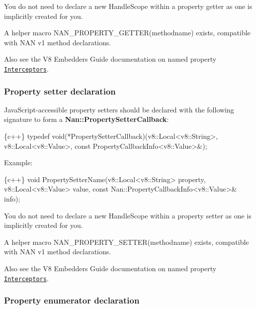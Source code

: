 You do not need to declare a new {\ttfamily Handle\+Scope} within a property getter as one is implicitly created for you.

A helper macro {\ttfamily N\+A\+N\+\_\+\+P\+R\+O\+P\+E\+R\+T\+Y\+\_\+\+G\+E\+T\+T\+E\+R(methodname)} exists, compatible with N\+AN v1 method declarations.

Also see the V8 Embedders Guide documentation on named property \href{https://developers.google.com/v8/embed#interceptors}{\tt Interceptors}.

\label{_api_nan_property_setter}%
 \subsubsection*{Property setter declaration}

Java\+Script-\/accessible property setters should be declared with the following signature to form a {\bfseries {\ttfamily Nan\+::\+Property\+Setter\+Callback}}\+:


\begin{DoxyCode}
\{c++\}
typedef void(*PropertySetterCallback)(v8::Local<v8::String>,
                                      v8::Local<v8::Value>,
                                      const PropertyCallbackInfo<v8::Value>&);
\end{DoxyCode}


Example\+:


\begin{DoxyCode}
\{c++\}
void PropertySetterName(v8::Local<v8::String> property,
                        v8::Local<v8::Value> value,
                        const Nan::PropertyCallbackInfo<v8::Value>& info);
\end{DoxyCode}


You do not need to declare a new {\ttfamily Handle\+Scope} within a property setter as one is implicitly created for you.

A helper macro {\ttfamily N\+A\+N\+\_\+\+P\+R\+O\+P\+E\+R\+T\+Y\+\_\+\+S\+E\+T\+T\+E\+R(methodname)} exists, compatible with N\+AN v1 method declarations.

Also see the V8 Embedders Guide documentation on named property \href{https://developers.google.com/v8/embed#interceptors}{\tt Interceptors}.

\label{_api_nan_property_enumerator}%
 \subsubsection*{Property enumerator declaration}


